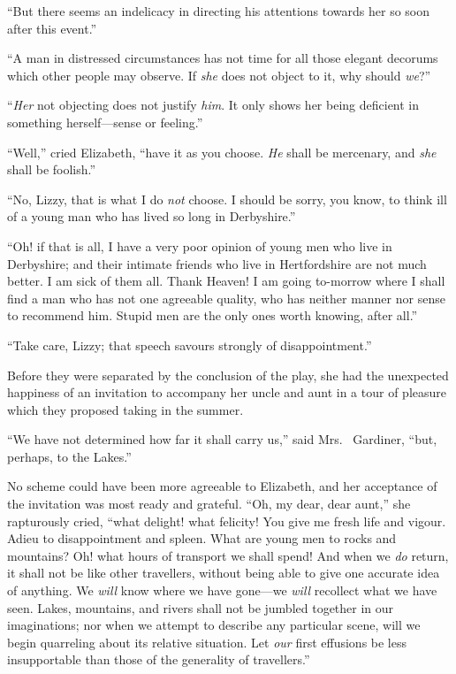 ``But there seems an indelicacy in directing his attentions
towards her so soon after this event.''

``A man in distressed circumstances has not time for all those
elegant decorums which other people may observe.  If \emph{she} does
not object to it, why should \emph{we}?''

``\emph{Her} not objecting does not justify \emph{him}.  It only shows her
being deficient in something herself---sense or feeling.''

``Well,'' cried Elizabeth, ``have it as you choose.  \emph{He} shall be
mercenary, and \emph{she} shall be foolish.''

``No, Lizzy, that is what I do \emph{not} choose.  I should be sorry,
you know, to think ill of a young man who has lived so long in
Derbyshire.''

``Oh! if that is all, I have a very poor opinion of young men
who live in Derbyshire; and their intimate friends who live
in Hertfordshire are not much better.  I am sick of them all.
Thank Heaven!  I am going to-morrow where I shall find a man
who has not one agreeable quality, who has neither manner nor
sense to recommend him.  Stupid men are the only ones worth
knowing, after all.''

``Take care, Lizzy; that speech savours strongly of disappointment.''

Before they were separated by the conclusion of the play, she
had the unexpected happiness of an invitation to accompany her
uncle and aunt in a tour of pleasure which they proposed taking
in the summer.

``We have not determined how far it shall carry us,'' said Mrs.\ %
Gardiner, ``but, perhaps, to the Lakes.''

No scheme could have been more agreeable to Elizabeth, and
her acceptance of the invitation was most ready and grateful.
``Oh, my dear, dear aunt,'' she rapturously cried, ``what delight!
what felicity!  You give me fresh life and vigour.  Adieu to
disappointment and spleen.  What are young men to rocks and
mountains?  Oh! what hours of transport we shall spend!  And
when we \emph{do} return, it shall not be like other travellers,
without being able to give one accurate idea of anything.  We
\emph{will} know where we have gone---we \emph{will} recollect what we have
seen.  Lakes, mountains, and rivers shall not be jumbled together
in our imaginations; nor when we attempt to describe any
particular scene, will we begin quarreling about its relative
situation.  Let \emph{our} first effusions be less insupportable than
those of the generality of travellers.''



